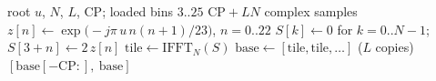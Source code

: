 \begin{algorithm}[H]
\caption{\textsc{GenZcPreamble}: the ZC block the transmitter emits and the detector cuts its kernel from.}
\label{alg:zc_gen}
\begin{algorithmic}[1]
\Require root $u$, $N$, $L$, $\mathrm{CP}$; loaded bins $3..25$
\Ensure $\mathrm{CP} + LN$ complex samples
\State $z[n] \gets \exp\!\big(-j\pi\, u\, n (n + 1) / 23\big)$, $n = 0..22$ 
\State $S[k] \gets 0$ for $k = 0..N{-}1$;\quad $S[3 + n] \gets 2\, z[n]$ 
\State $\mathrm{tile} \gets \mathrm{IFFT}_N(S)$ 
\State $\mathrm{base} \gets [\mathrm{tile}, \mathrm{tile}, \ldots]$ ($L$ copies) 
\State \Return $[\mathrm{base}[-\mathrm{CP}:],\ \mathrm{base}]$ 
\end{algorithmic}
\end{algorithm}

